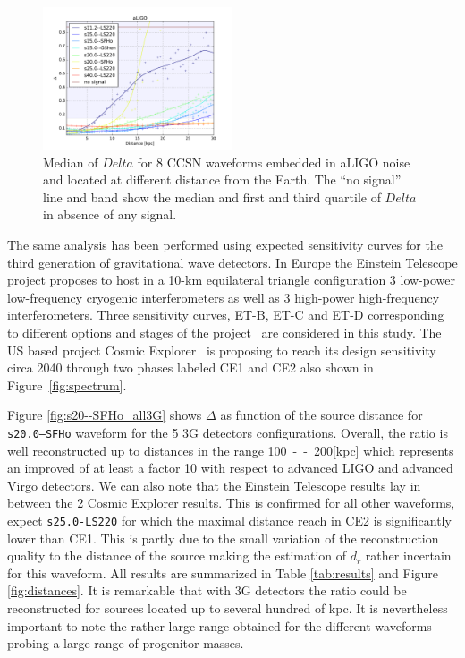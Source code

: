 \begin{figure}
  \centering
  \includegraphics[width=0.5\textwidth]{plots/aLIGO_delta_allwvfs}
 \caption{Median of $Delta$ for 8 CCSN waveforms embedded in aLIGO noise and located at different distance from the Earth. The ``no signal'' line and band show the median and first and third quartile of $Delta$ in absence of any signal.} \label{fig:aLIGO_prec_allwvf}
\end{figure}

The same analysis has been performed using expected sensitivity curves for the third generation of
gravitational wave detectors. In Europe the Einstein Telescope project proposes to host in a 10-km
equilateral triangle configuration 3 low-power low-frequency cryogenic interferometers as well as 3
high-power high-frequency interferometers. Three sensitivity curves, ET-B, ET-C and ET-D corresponding
to different options and stages of the project~\cite{Hild_2011} are considered in this study.
The US based project Cosmic Explorer~\cite{reitze2019cosmic} is proposing to reach its design
sensitivity circa 2040 through two phases labeled CE1 and CE2 also shown in Figure~\ref{fig:spectrum}. 

Figure \ref{fig:s20--SFHo_all3G} shows $\Delta$ as function of the source distance for {\tt s20.0--SFHo}
waveform for the 5 3G detectors configurations. Overall, the ratio is well reconstructed up to distances
in the range \unit{100--200}[kpc] which represents an improved of at least a factor 10 with respect to
advanced LIGO and advanced Virgo detectors. We can also note that the Einstein Telescope results lay in
between the 2 Cosmic Explorer results. This is confirmed for all other waveforms, expect {\tt s25.0-LS220}
for which the maximal distance reach in CE2 is significantly lower than CE1. This is partly due to the
small variation of the reconstruction quality to the distance of the source making the estimation of $d_r$
rather incertain for this waveform. All results are summarized in Table \ref{tab:results} and Figure
\ref{fig:distances}. It is remarkable that with 3G detectors the ratio could be reconstructed for sources
located up to several hundred of kpc. It is nevertheless important to note the rather large range obtained
for the different waveforms probing a large range of progenitor masses.


